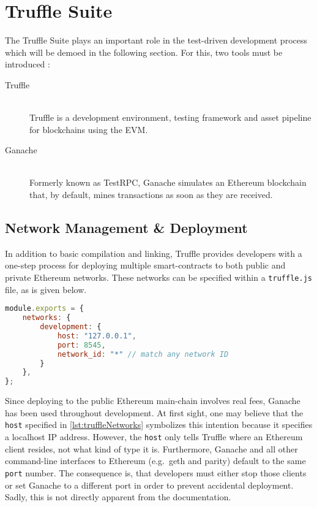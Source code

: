 \pagebreak

\section{Truffle Suite}
The Truffle Suite plays an important role in the test-driven development process which will be demoed in the following section. For this, two tools must be introduced \cite{truffleSuite}:

\begin{description}
  \item[Truffle]
  \hfill \\
  Truffle is a development environment, testing framework and asset pipeline for blockchains using the \ac{EVM}.
  \item[Ganache]
  \hfill \\
  Formerly known as TestRPC, Ganache simulates an Ethereum blockchain that, by default, mines transactions as soon as they are received. 
\end{description}

\subsection{Network Management \& Deployment}
In addition to basic compilation and linking, Truffle provides developers with a one-step process for deploying multiple smart-contracts to both public and private Ethereum networks. These networks can be specified within a \texttt{truffle.js} file, as is given below. 

\begin{lstlisting}[language=JavaScript, caption=Truffle network management, label=lst:truffleNetworks]
module.exports = {
	networks: {
		development: {
			host: "127.0.0.1",
			port: 8545,
			network_id: "*" // match any network ID
		}
	},
};
\end{lstlisting}

Since deploying to the public Ethereum main-chain involves real fees, Ganache has been used throughout development. At first sight, one may believe that the \texttt{host} specified in \autoref{lst:truffleNetworks} symbolizes this intention because it specifies a localhost IP address. However, the \texttt{host} only tells Truffle where an Ethereum client resides, not what kind of type it is. Furthermore, Ganache and all other command-line interfaces to Ethereum (e.g.~geth and parity) default to the same \texttt{port} number. The consequence is, that developers must either stop those clients or set Ganache to a different port in order to prevent accidental deployment. Sadly, this is not directly apparent from the documentation. 

